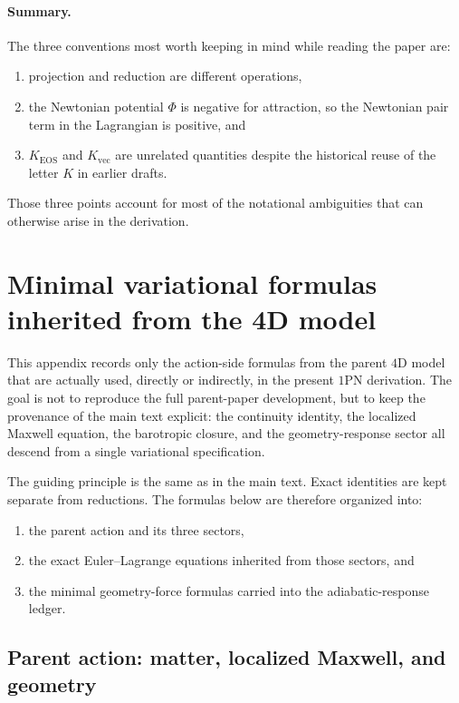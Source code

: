 \documentclass[11pt]{article}
\newcommand{\Kvec}{K_{\mathrm{vec}}}
\newcommand{\KEOS}{K_{\mathrm{EOS}}}
\newcommand{\PhiN}{\Phi}
\begin{document}
\paragraph{Summary.}
The three conventions most worth keeping in mind while reading the paper are:
\begin{enumerate}[leftmargin=1.5em]
  \item projection and reduction are different operations,
  \item the Newtonian potential \(\PhiN\) is negative for attraction, so the Newtonian
  pair term in the Lagrangian is positive, and
  \item \(\KEOS\) and \(\Kvec\) are unrelated quantities despite the historical reuse of
  the letter \(K\) in earlier drafts.
\end{enumerate}
Those three points account for most of the notational ambiguities that can otherwise arise
in the derivation.

\section{Minimal variational formulas inherited from the 4D model}
\label{app:variational}

This appendix records only the action-side formulas from the parent \(4\)D model that are
actually used, directly or indirectly, in the present \(1\)PN derivation. The goal is not
to reproduce the full parent-paper development, but to keep the provenance of the main
text explicit: the continuity identity, the localized Maxwell equation, the barotropic
closure, and the geometry-response sector all descend from a single variational
specification.

The guiding principle is the same as in the main text. Exact identities are kept separate
from reductions. The formulas below are therefore organized into:
\begin{enumerate}[leftmargin=1.5em]
  \item the parent action and its three sectors,
  \item the exact Euler--Lagrange equations inherited from those sectors, and
  \item the minimal geometry-force formulas carried into the adiabatic-response ledger.
\end{enumerate}

\subsection{Parent action: matter, localized Maxwell, and geometry}
\label{app:variational-action}
\end{document}
